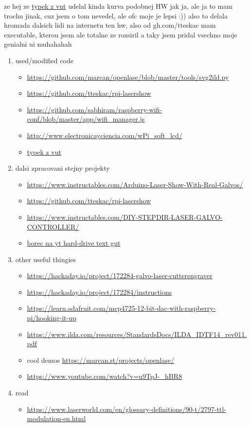\documentclass{template/socthesis}
\begin{document}
ze hej ze \href{https://dspace.vutbr.cz/bitstream/handle/11012/38621/final-thesis.pdf?sequence=-1}{typek z vut} udelal kinda kurva podobnej HW jak ja, ale ja to mam trochu jinak, cuz jsem o tom nevedel, ale ofc moje je lepsi :))
also to delala hromada dalsich lidi na internetu ten hw, also od gh.com/tteskac mam executable, kterou jsem ale totalne ze rozsiril a taky jsem pridal vsechno moje genialni ui muhahahah

\begin{enumerate}
  \item used/modified code
  \begin{itemize}
    \item \url{https://github.com/marcan/openlase/blob/master/tools/svg2ild.py}
    \item \url{https://github.com/tteskac/rpi-lasershow}
    \item \url{https://github.com/sabhiram/raspberry-wifi-conf/blob/master/app/wifi_manager.js}
    \item \url{http://www.electronicayciencia.com/wPi_soft_lcd/}
    \item \href{https://dspace.vutbr.cz/bitstream/handle/11012/38621/final-thesis.pdf?sequence=-1}{typek z vut}
  \end{itemize}
  \item dalsi zpracovani stejny projekty
  \begin{itemize}
    \item \url{https://www.instructables.com/Arduino-Laser-Show-With-Real-Galvos/}
    \item \url{https://github.com/tteskac/rpi-lasershow}
    \item \url{https://www.instructables.com/DIY-STEPDIR-LASER-GALVO-CONTROLLER/}
    \item \href{https://youtu.be/u9TpJ-_hBR8?si=mHy-UrptZZJ0Xu5-}{borec na yt hard-drive text gut}
  \end{itemize}
  \item other useful thingies
  \begin{itemize}
    \item \url{https://hackaday.io/project/172284-galvo-laser-cutterengraver}

    \item \url{https://hackaday.io/project/172284/instructions}

    \item \url{https://learn.adafruit.com/mcp4725-12-bit-dac-with-raspberry-pi/hooking-it-up}
    \item \url{https://www.ilda.com/resources/StandardsDocs/ILDA_IDTF14_rev011.pdf}
    \item cool demos \url{https://marcan.st/projects/openlase/}
    \item \url{https://www.youtube.com/watch?v=u9TpJ-_hBR8}
  \end{itemize}
  \item read
  \begin{itemize}
    \item \url{https://www.laserworld.com/en/glossary-definitions/90-t/2797-ttl-modulation-en.html}
  \end{itemize}


\end{enumerate}
\end{document}
